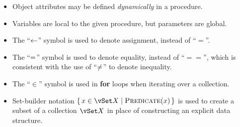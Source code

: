\begin{itemize}
    \item Object attributes may be defined \emph{dynamically} in a procedure.
    \item Variables are local to the given procedure, but parameters are global.
    \item The ``$\leftarrow$'' symbol is used to denote assignment, instead of ``$=$''.
    \item The ``$=$'' symbol is used to denote equality, instead of ``$==$'', which is consistent with the use of ``$\neq$'' to denote inequality.
    \item The ``$\in$'' symbol is used in \textbf{for} loops when iterating over a collection.
    \item Set-builder notation $\setBuilder{\vSomeElement \in \vSomeSet}{\cPredicate[\vSomeElement]}$ is used to create a subset of a collection $\vSomeSet$ in place of constructing an explicit data structure.
\end{itemize}